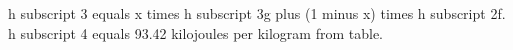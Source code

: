 h subscript 3 equals x times h subscript 3g plus (1 minus x) times h subscript 2f. h subscript 4 equals 93.42 kilojoules per kilogram from table.